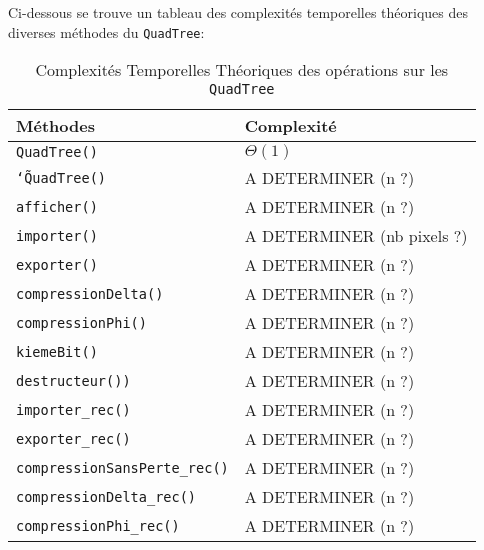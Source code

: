 \documentclass{article}
\newcommand{\info}{\texttt}
\newcommand{\qt}{\info{QuadTree}}
\begin{document}
        Ci-dessous se trouve un tableau des complexités temporelles théoriques des diverses méthodes du \qt :
        \begin{table}[H]
        	\centering
        	\label{ComplexiteTheo}
        	\begin{tabular}{|l|l|}
        		\hline
        		\rowcolor[HTML]{C0C0C0} 
        		{\color[HTML]{333333} \textbf{Méthodes}} & \textbf{Complexité} \\ \hline
        		\info{QuadTree()}                                 &  $\Theta(1)$                   \\ \hline
        		\info{\char`\~QuadTree()}                                &  A DETERMINER (n ?)                   \\ \hline
        		\info{afficher()}                                &  A DETERMINER (n ?)                   \\ \hline
        		\info{importer()}                                 &  A DETERMINER (nb pixels ?)                   \\ \hline
        		\info{exporter()}                               &  A DETERMINER (n ?)                   \\ \hline
        		\info{compressionDelta()}                                &  A DETERMINER (n ?)                   \\ \hline
        		\info{compressionPhi()}                                 &  A DETERMINER (n ?)                   \\ \hline
        		\info{kiemeBit()}                                 &  A DETERMINER (n ?)                   \\ \hline
        		\info{destructeur())}                                 &  A DETERMINER (n ?)                   \\ \hline
        		\info{importer_rec()}                                 &  A DETERMINER (n ?)                   \\ \hline
        		\info{exporter_rec()}                                 &  A DETERMINER (n ?)                   \\ \hline
        		\info{compressionSansPerte_rec()}                                 &  A DETERMINER (n ?)                   \\ \hline
        		\info{compressionDelta_rec()}                                 &  A DETERMINER (n ?)                   \\ \hline
        		\info{compressionPhi_rec()}                                 &  A DETERMINER (n ?)                   \\ \hline
        	\end{tabular}
        	\caption{Complexités Temporelles Théoriques des opérations sur les \qt}
        \end{table}
        
\end{document}
